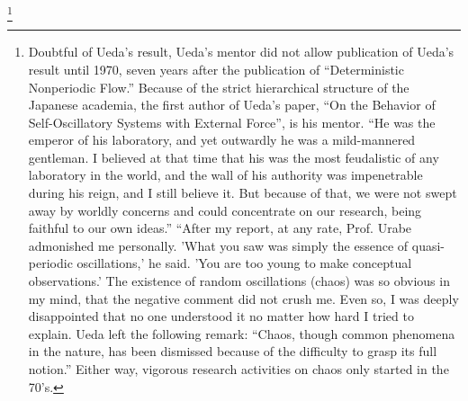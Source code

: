\footnote{Doubtful of Ueda's result, Ueda's mentor did not allow publication of Ueda's result until 1970, seven years after the publication of ``Deterministic Nonperiodic Flow.''
  Because of the strict hierarchical structure of the Japanese academia, the first author of Ueda's paper, ``On the Behavior of Self-Oscillatory Systems with External Force'', is his mentor.%
  ``He was the emperor of his laboratory, and yet outwardly he was a mild-mannered gentleman.
  I believed at that time that his was the most feudalistic of any laboratory in the world, and the wall of his authority was impenetrable during his reign, and I still believe it.
  But because of that, we were not swept away by worldly concerns and could concentrate on our research, being faithful to our own ideas.''
  ``After my report, at any rate, Prof. Urabe admonished me personally.
  'What you saw was simply the essence of quasi-periodic oscillations,' he said.
  'You are too young to make conceptual observations.'
  The existence of random oscillations (chaos) was so obvious in my mind, that the negative comment did not crush me.
  Even so, I was deeply disappointed that no one understood it no matter how hard I tried to explain.\citep[p47]{ueda-abraham}
  Ueda left the following remark: ``Chaos, though common phenomena in the nature, has been dismissed because of the difficulty to grasp its full notion.''\citep[p533]{gleick}
Either way, vigorous research activities on chaos only started in the 70's.}

